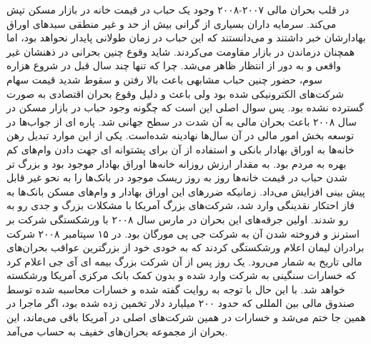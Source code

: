 \documentclass[a4paper,titlepage,12pt,fleqn,oneside]{report}
\begin{document}
	در قلب بحران مالی ۲۰۰۷-۲۰۰۸ وجود یک حباب در قیمت خانه در بازار مسکن تپش می‌کند. سرمایه داران بسیاری از گرانی بیش از حد و غیر منطقی سبد‌های اوراق بهادارشان خبر داشتند و می‌دانستند که این حباب در زمان طولانی پایدار نحواهد بود، اما همچنان درماندن در بازار مقاومت می‌کردند. شاید وقوع چنین بحرانی در ذهنشان غیر واقعی و به دور از انتظار ظاهر می‌شد. چرا که تنها چند سال قبل در شروع هزاره سوم، حضور چنین حباب مشابهی باعث بالا رفتن و سقوط شدید قیمت سهام شرکت‌های الکترونیکی شده بود ولی باعث و دلیل وقوع بحران اقتصادی به صورت گسترده نشده بود. پس سوال اصلی این است که چگونه وجود حباب در بازار مسکن در سال ۲۰۰۸ باعث بحران مالی به آن شدت در سطح جهانی شد. پاره ای از جواب‌ها در توسعه‌ بخش امور مالی در آن سال‌ها نهادینه شده‌است. یکی از این موارد تبدیل رهن خانه‌ها به اوراق بهادار بانکی و استفاده از آن برای پشتوانه ای جهت دادن وام‌های کم بهره به مردم بود. به مقدار ارزش روزانه خانه‌ها اوراق بهادار موجود بود و بزرگ تر شدن حباب در قیمت خانه‌ها روز به روز ریسک موجود در بانک‌ها را به نحو غیر قابل پیش بینی افزایش می‌داد. زمانیکه ضررهای این اوراق بهادار و وام‌های مسکن بانک‌ها به فاز احتکار نقدینگی وارد شد، شرکت‌های بزرگ آمریکا با مشکلات بزرگ و جدی رو به رو شدند. اولین جرقه‌های این بحران در مارس سال ۲۰۰۸ با ورشکستگی 
	شرکت بر استرنز و فروخته شدن آن به شرکت جی پی مورگان بود. در ۱۵ سپتامبر ۲۰۰۸ شرکت برادران لیمان اعلام ورشکستگی کردند که به خودی خود از بزرگترین عواقب بحران‌های مالی تاریخ به شمار می‌رود. یک روز پس از آن شرکت بزرگ بیمه ای آی جی اعلام کرد که خسارات سنگینی به شرکت وارد شده و بدون کمک بانک مرکزی آمریکا ورشکسته خواهد شد. با این حال با توجه به روایت گفته شده و خسارات محاسبه شده توسط صندوق مالی بین المللی که حدود ۲۰۰ میلیارد دلار تخمین زده شده بود، اگر ماجرا در همین جا ختم می‌شد و خسارات در همین شرکت‌های اصلی در آمریکا باقی می‌ماند، این بحران از مجموعه بحران‌های خفیف به حساب می‌آمد.
	
\end{document}

